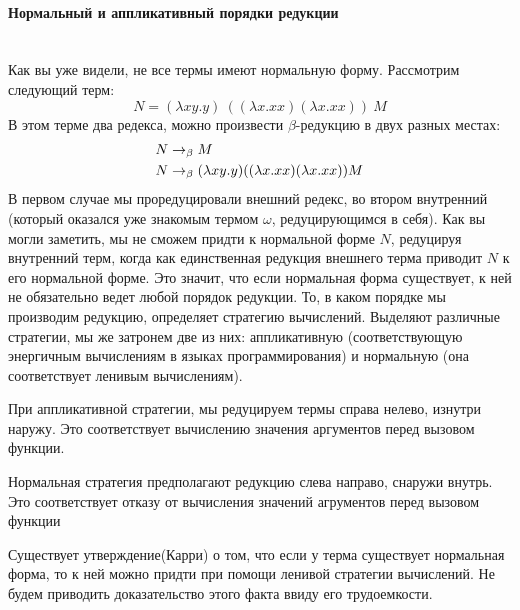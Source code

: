 \documentclass[lambda.tex]{subfiles}
\begin{document}
\newpage
\paragraph{Нормальный и аппликативный порядки редукции} %
\label{par:lazy and energic reduction}~\\

Как вы уже видели, не все термы имеют нормальную форму. Рассмотрим следующий терм:
\begin{equation*}
	N = (\lambda x y.y)\ ((\lambda x.xx)(\lambda x.xx))\ M
\end{equation*}
В этом терме два редекса, можно произвести $\beta$-редукцию в двух разных местах:
\begin{align*}
	N &\rightarrow_\beta M\\
	N &\rightarrow_\beta (\lambda x y.y) ((\lambda x.xx)(\lambda x.xx)) M
\end{align*}
В первом случае мы проредуцировали внешний редекс, во втором внутренний (который оказался уже знакомым термом $\omega$, редуцирующимся в себя). Как вы могли заметить, мы не сможем придти к нормальной форме $N$, редуцируя внутренний терм, когда как единственная редукция внешнего терма приводит $N$ к его нормальной форме. Это значит, что если нормальная форма существует, к ней не обязательно ведет любой порядок редукции. То, в каком порядке мы производим редукцию, определяет стратегию вычислений. Выделяют различные стратегии, мы же затронем две из них: аппликативную (соответствующую энергичным вычислениям в языках программирования) и нормальную (она соответствует ленивым вычислениям).

При аппликативной стратегии, мы редуцируем термы справа нелево, изнутри наружу. Это соответствует вычислению значения аргументов перед вызовом функции.

Нормальная стратегия предполагают редукцию слева направо, снаружи внутрь. Это соответствует отказу от вычисления значений агрументов перед вызовом функции

Существует утверждение(Карри) о том, что если у терма существует нормальная форма, то к ней можно придти при помощи ленивой стратегии вычислений. Не будем приводить доказательство этого факта ввиду его трудоемкости. 
\end{document}
